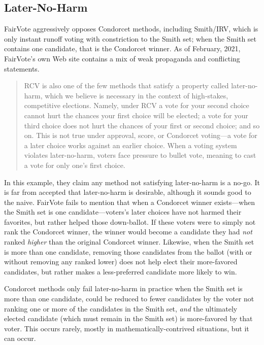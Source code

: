 \subsection{Later-No-Harm}
FairVote aggressively opposes Condorcet methods, including Smith/IRV, which is only instant runoff voting with constriction to the Smith set; when the Smith set contains one candidate, that is the Condorcet winner.  As of February, 2021, FairVote's own Web site contains a mix of weak propaganda and conflicting statements.

\begin{quotation}
    RCV is also one of the few methods that satisfy a property called later-no-harm, which we believe is necessary in the context of high-stakes, competitive elections. Namely, under RCV a vote for your second choice cannot hurt the chances your first choice will be elected; a vote for your third choice does not hurt the chances of your first or second choice; and so on. This is not true under approval, score, or Condorcet voting—a vote for a later choice works against an earlier choice. When a voting system violates later-no-harm, voters face pressure to bullet vote, meaning to cast a vote for only one's first choice.
\end{quotation}

In this example, they claim any method not satisfying later-no-harm is a no-go.  It is far from accepted that later-no-harm is desirable, although it sounds good to the naive.  FairVote fails to mention that when a Condorcet winner exists—when the Smith set is one candidate—voters's later choices have not harmed their favorites, but rather helped those down-ballot.  If these voters were to simply not rank the Condorcet winner, the winner would become a candidate they had \textit{not} ranked \textit{higher} than the original Condorcet winner.  Likewise, when the Smith set is more than one candidate, removing those candidates from the ballot (with or without removing any ranked lower) does not help elect their more-favored candidates, but rather makes a less-preferred candidate more likely to win.

Condorcet methods only fail later-no-harm in practice when the Smith set is more than one candidate, could be reduced to fewer candidates by the voter not ranking one or more of the candidates in the Smith set, \textit{and} the ultimately elected candidate (which must remain in the Smith set) is more-favored by that voter.  This occurs rarely, mostly in mathematically-contrived situations, but it can occur.

